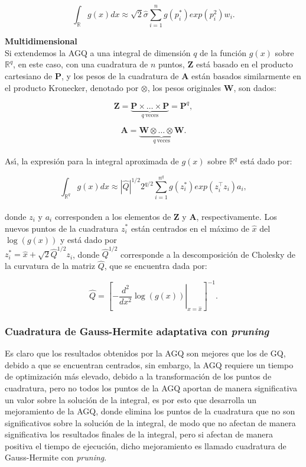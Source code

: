 \[
\int_{\mathbb{R}}{g(x)dx}\approx\sqrt{2}\hat{\sigma}\sum_{i=1}^{n}{g(p_i^*)exp(p_i^2)w_i.}
\]

\textbf{Multidimensional\\}
Si extendemos la AGQ a una integral de dimensi\'{o}n $q$ de la funci\'{o}n $g(x)$ sobre $\mathbb{R}^q$, en este caso, con una cuadratura de $n$ puntos, $\textbf{Z}$ est\'{a} basado en el producto cartesiano de $\textbf{P}$, y los pesos de la cuadratura de $\textbf{A}$ est\'{a}n basados similarmente en el producto Kronecker, denotado por $\otimes$, los pesos originales $\textbf{W}$, son dados:

\[
\textbf{Z}=\underbrace{\textbf{P} \times \ldots \times \textbf{P}}_{q\ \text{veces}}=\textbf{P}^q,
\]

\[
\textbf{A}=\underbrace{\textbf{W} \otimes \ldots \otimes \textbf{W}}_{q\ \text{veces}}.
\]
\\
As\'{\i}, la expresi\'{o}n para la integral aproximada de $g(x)$ sobre $\mathbb{R}^q$ est\'{a} dado por:

\[
\int_{\mathbb{R}^q}{g(x)dx}\approx|\hat{Q}|^{1/2} 2^{q/2}\sum_{i=1}^{n^q}g(z_i^*)exp(z_i^{\top}z_i)a_i,
\]
\\
donde $z_i$ y $a_i$ corresponden a los elementos de $\textbf{Z}$ y $\textbf{A}$, respectivamente. Los nuevos puntos de la cuadratura $z_i^*$ est\'{a}n centrados en el m\'{a}ximo de $\hat{x}$ del $\log(g(x))$ y est\'{a} dado por \\
$z_i^*=\hat{x}+\sqrt{2}\hat{Q}^{1/2}z_i$, donde $\hat{Q}^{1/2}$ corresponde a la descomposici\'{o}n de Cholesky de la curvatura de la matriz $\hat{Q}$, que se encuentra dada por:

\[
\hat{Q}={\left[\left. -\frac{d^2}{dx^2}\log(g(x))\right|_{x=\hat{x}}\right]^{-1}}.
\]

\subsubsection{Cuadratura de Gauss-Hermite adaptativa con \textit{pruning}}

Es claro que los resultados obtenidos por la AGQ son mejores que los de GQ, debido a que se encuentran centrados, sin embargo, la AGQ requiere un tiempo de optimizaci\'{o}n m\'{a}s elevado, debido a la transformaci\'{o}n de los puntos de cuadratura, pero no todos los puntos de la AGQ aportan de manera significativa un valor sobre la soluci\'{o}n de la integral, es por esto que \cite{Hernandez1} desarrolla un mejoramiento de la AGQ, donde elimina los puntos de la cuadratura que no son significativos sobre la soluci\'{o}n de la integral, de modo que no afectan de manera significativa los resultados finales de la integral, pero si afectan de manera positiva el tiempo de ejecuci\'{o}n, dicho mejoramiento es llamado cuadratura de Gauss-Hermite con \textit{pruning}.\\


